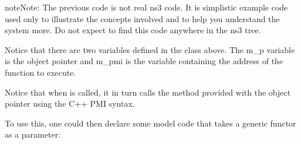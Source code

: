 \documentclass[letterpaper,10pt,english]{sphinxmanual}
\renewcommand{\sphinxcode}[1]{\texttt{\small{#1}}}
\begin{document}
\begin{sphinxVerbatim}[commandchars=\\\{\}]
 
      
   
            
 

 
   
     
\end{sphinxVerbatim}

\begin{sphinxadmonition}{note}{Note:}
The previous code is not real ns\sphinxhyphen{}3 code.  It is simplistic example
code used only to illustrate the concepts involved and to help you understand
the system more.  Do not expect to find this code anywhere in the ns\sphinxhyphen{}3 tree.
\end{sphinxadmonition}

Notice that there are two variables defined in the class above.  The m\_p
variable is the object pointer and m\_pmi is the variable containing the
address of the function to execute.

Notice that when \sphinxcode{} is called, it in turn calls the method provided
with the object pointer using the C++ PMI syntax.

To use this, one could then declare some model code that takes a generic functor
as a parameter:

\begin{sphinxVerbatim}[commandchars=\\\{\}]
   
\end{sphinxVerbatim}
\end{document}
